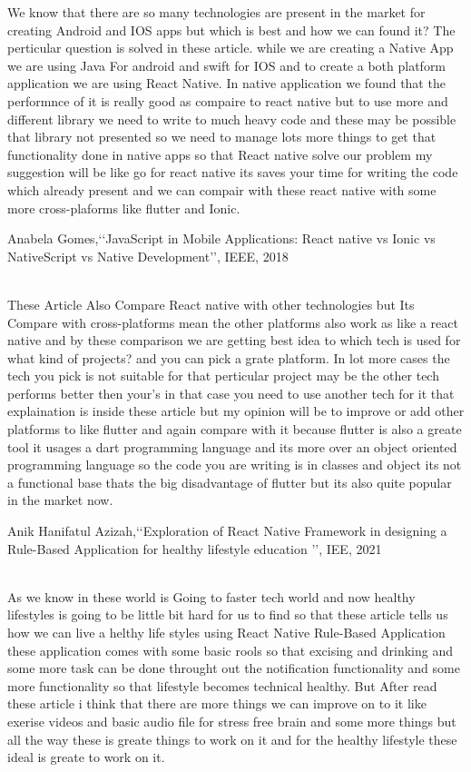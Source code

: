 \documentclass[12pt,a4paper]{report}
\begin{document}
\begin{enumerate}
 We know that there are so many technologies are present in the market for creating Android and IOS apps but which is best and how we can found it? The perticular question is solved in these article. while we are creating a Native App we are using Java For android and swift for IOS and to create a both platform application we are using React Native. In native application we found that the performnce of it is really good as compaire to react native but to use more and different library  we need to write to much heavy code and these may be possible that library not presented so we need to manage lots more things to get that functionality done in native apps so that React native solve our problem my suggestion will be like go for react native its saves your time for writing the code which already present and we can compair with these react native with some more cross-plaforms like flutter  and Ionic. 

\newpage

{\bf\item Anabela Gomes,\lq\lq JavaScript in Mobile Applications: React native vs Ionic vs NativeScript vs Native Development\rq\rq, IEEE, 2018}
\\

 These Article Also Compare React native with other technologies but Its Compare with cross-platforms mean the other platforms also work as like a react native and by these comparison we are getting best idea to which tech is used for what kind of projects? and you can pick a grate platform. In lot more cases the tech you pick is not suitable for that perticular project may be the other tech performs better then your's in that case you need to use another tech for it that explaination is inside these article but my opinion will be to improve or add other platforms to like flutter and again compare with it because flutter is also a greate tool it usages a dart programming language and its more over an object oriented programming language  so the code you are writing is in classes and object its not a functional base thats the big disadvantage of flutter but its also quite popular in the market now.


{\bf\item Anik Hanifatul Azizah,\lq\lq Exploration of React Native Framework in designing a Rule-Based Application for healthy lifestyle education \rq\rq, IEE, 2021}
\\
As  we know in these world is Going to faster tech world and now healthy lifestyles is going to be little bit hard for us to find so that these article tells us how we can live a helthy life styles using React Native Rule-Based Application these application comes with some basic rools so that excising and drinking and some more task can be done throught out the notification functionality and some more functionality so that lifestyle becomes technical healthy. But After read these article i think that there are more things we can improve on to it like exerise videos and basic audio file for stress free brain and some more things but all the way these is greate things to work on it and for the healthy lifestyle these ideal is greate to work on it.
\end{enumerate}
\newpage
\end{document}
